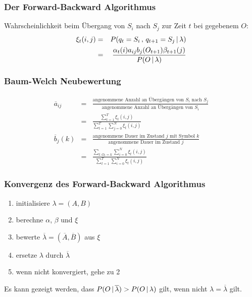 \subsubsection*{Der Forward-Backward Algorithmus}

Wahrscheinlichkeit beim Übergang von $S_i$ nach $S_j$ zur Zeit $t$ bei gegebenem $O$:
\begin{eqnarray*}
\xi_t(i,j) &=& P(q_t = S_i \, , \, q_{t+1} = S_j \, | \, \lambda) \\ &=& \frac{\alpha_t(i) a_{ij} b_j(O_{t+1}) \beta_{t+1}(j)}{P(O \, | \, \lambda)}
\end{eqnarray*}

\subsubsection*{Baum-Welch Neubewertung}

\begin{eqnarray*}
\overline{a}_{ij} &=& \frac{\textrm{angenommene Anzahl an Übergängen von } S_i \textrm{ nach } S_j}{\textrm{angenommene Anzahl an Übergängen von } S_i} \\
&=& \frac{\sum_{t=1}^T \xi_t(i,j)}{\sum_{t=1}^T \sum_{j=0}^N \xi_t(i,j)} \\
\overline{b}_j(k) &=& \frac{\textrm{angenommene Dauer im Zustand } j \textrm{ mit Symbol } k}{\textrm{angenommene Dauer im Zustand } j} \\
&=& \frac{\sum_{t: O_t = k} \sum_{i=0}^N \xi_t(i,j)}{\sum_{t=1}^T \sum_{i=0}^N \xi_t(i,j)}
\end{eqnarray*}

\subsubsection*{Konvergenz des Forward-Backward Algorithmus}

\begin{enumerate}
\item initialisiere $\lambda = (A,B)$
\item berechne $\alpha$, $\beta$ und $\xi$
\item bewerte $\overline{\lambda} = (\overline{A},\overline{B})$ aus $\xi$
\item ersetze $\lambda$ durch $\overline{\lambda}$
\item wenn nicht konvergiert, gehe zu 2
\end{enumerate}
Es kann gezeigt werden, dass $P(O \, | \, \overline{\lambda}) > P(O \, | \, \lambda)$ gilt, wenn nicht $\lambda = \overline{\lambda}$ gilt.

